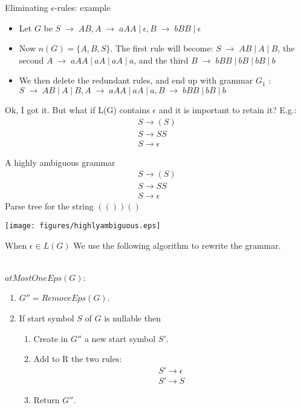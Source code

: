 \documentclass{prosper}%
\newcommand{\e} {{\mbox{$\epsilon$}}}
\newcommand{\ra}{\mbox{$\;\rightarrow\;$}}
\newcommand{\vb}{\mbox{$\;|\:$}}
\begin{document}
\begin{slide}{Eliminating \e-rules: example}
\begin{itemize}
\item Let $G$ be $S\ra AB, A\ra aAA\vb\e, B\ra bBB\vb\e$
\item Now $n(G) = \{A, B, S\}$. The first rule will become: $S \ra AB\vb A\vb B$,
the second $A \ra aAA\vb aA\vb aA\vb a$, and the third $B \ra bBB\vb bB\vb bB\vb b$
\item We then delete the redundant rules, and end up with grammar $G_1$ :
\(
S \ra AB\vb A\vb B, A \ra aAA\vb aA\vb a, B \ra bBB\vb bB\vb b
\)
\end{itemize}
Ok, I got it. But what if L(G) contains  $\epsilon$ and it is important to retain it? E.g.:
\[
\begin{array}{l}
S\rightarrow (S)\\
S \rightarrow SS\\
S\rightarrow \epsilon
\end{array}
\]
\end{slide}

\begin{slide}{A highly ambiguous grammar}
\[
\begin{array}{l}
S\rightarrow (S)\\
S \rightarrow SS\\
S\rightarrow \epsilon
\end{array}
\]
Parse tree for the string $(())()$
\begin{center}
\texttt{[image: figures/highlyambiguous.eps]}
\end{center}
\end{slide}

\begin{slide}{When $\epsilon \in L(G)$}
We use the following algorithm to rewrite the grammar.\\\ 

{
$atMostOneEps(G)$:
\begin{enumerate}
\item $G'' = RemoveEps(G)$.
\item If start symbol $S$ of $G$ is nullable then
\begin{enumerate}
\item Create in $G''$ a new start symbol $S'$.
\item Add to R the two rules:
\[
\begin{array}{l}
	       		S' \rightarrow \epsilon\\  
				S' \rightarrow S
\end{array}
\]
\item Return $G''$.
\end{enumerate}
\end{enumerate}}
\end{slide}
\end{document}
